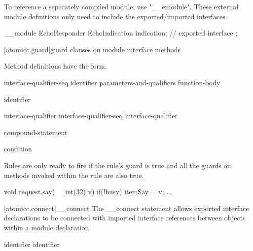 To reference a separately compiled module, use "__emodule".  These external
module definitions only need to include the exported/imported interfaces.

\begin{example}
\begin{codeblock}
     __module EchoResponder {
         EchoIndication   indication;           // exported interface
     };
\end{codeblock}
\end{example}

[atomicc.guard]{guard clauses on module interface methods}

\pnum
Method definitions have the form:

\begin{bnf}
\br
     interface-qualifier-seq identifier parameters-and-qualifiers function-body
\end{bnf}

\begin{bnf}
\br
    identifier 

 \br
    interface-qualifier \br
    interface-qualifier-seq interface-qualifier
\end{bnf}

\begin{bnf}
\br
      compound-statement

\br
     condition \terminal{)}

\end{bnf}


Rules are only ready to fire if the rule's guard is true and all the
guards on methods invoked within the rule are also true.

\begin{codeblock}
         void request.say(__int(32) v) if(!busy) {
             itemSay = v;
             ...
         }
\end{codeblock}

[atomicc.connect]{__connect}
The __connect statement allows exported interface declarations to be connected
with imported interface references between objects within a module declaration.

\begin{bnf}
\br
     identifier \terminal{=} identifier \terminal{;}
\end{bnf}

